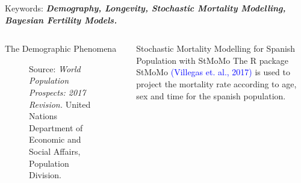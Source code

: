 \documentclass[]{beamer}
\begin{document}
\begin{frame}{\vspace{1ex}\hfill Keywords: \bfseries \textit{Demography, Longevity, Stochastic Mortality Modelling, Bayesian Fertility Models.}}
\begin{columns}[t]
\begin{block}{The Demographic Phenomena}
\begin{multicols}{2}
				\begin{figure}[h]
					\centering
					\caption{\small Source: \textit{World Population Prospects: 2017 Revision.} United Nations Department of Economic and Social Affairs, Population Division.}
					\label{poblacion}
				\end{figure}
				\vspace{-0.9cm}
			\end{multicols}
		\end{block}

\vspace{-0.5cm}
		\begin{block}{Stochastic Mortality Modelling for Spanish Population with StMoMo}\vspace{-0.5cm}
			\setlength{\parindent}{1.2em}
			\setlength{\parskip}{1ex}
			The R package StMoMo \textcolor{blue}{(Villegas et. al., 2017)} is used to project the mortality rate according to age, sex and time for the spanish population.
\vspace{-1cm}     %


\end{block}
\end{columns}
\end{frame}
\end{document}
